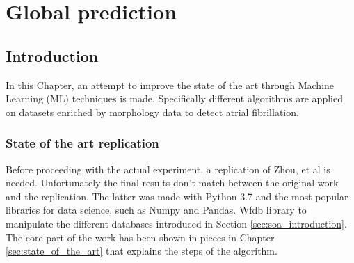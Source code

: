 \chapter{Global prediction}
\label{sec:global}

\section{Introduction}
\label{sec:global_introduction}
In this Chapter, an attempt to improve the state of the art through Machine Learning (ML) techniques is made. Specifically different algorithms are applied on datasets enriched by morphology data to detect atrial fibrillation.

\subsection{State of the art replication}
Before proceeding with the actual experiment, a replication of Zhou, et al\cite{zhou2015} is needed. Unfortunately the final results don't match between the original work and the replication.
The latter was made with Python 3.7 and the most popular libraries for data science, such as Numpy and Pandas. Wfdb library to manipulate the different databases introduced in Section \ref{sec:soa_introduction}.
The core part of the work has been shown in pieces in Chapter \ref{sec:state_of_the_art} that explains the steps of the algorithm.
